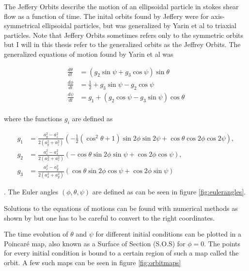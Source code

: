 The Jeffery Orbits describe the motion of an ellipsoidal particle in stokes shear flow as a function of time. The inital orbits found by Jeffery were for axis-symmetrical ellipsoidal particles, but was generalized by Yarin et al \cite{Yarin} to triaxial particles. Note that Jeffery Orbits sometimes refers only to the symmetric orbits but I will in this thesis refer to the generalized orbits as the Jeffrey Orbits. The generalized equations of motion found by Yarin et al was

\begin{subequations}\label{eq:jeffrey}
\begin{align}
\frac{d\theta}{dt} 	&= (g_2 \sin \psi + g_3 \cos \psi ) \sin \theta \\
\frac{d\phi}{dt} 	&= \tfrac{1}{2} + g_3\sin \psi - g_2 \cos \psi\\
\frac{d\psi}{dt}	&= g_1 + (g_2\cos \psi - g_3\sin \psi) \cos \theta \\
\end{align}
\end{subequations}

where the functions  $g_i$ are defined as

\begin{subequations}
\begin{align}
g_1 &= \frac{a_y^2 - a_z^2}{2(a_y^2 + a_z^2)} 
		\left(-\tfrac{1}{2}(\cos^2 \theta + 1 )\sin 2\phi \sin 2\psi + \cos\theta \cos 2\phi \cos 2\psi \right), \\
g_2 &= \frac{a_z^2 - a_x^2}{2(a_x^2 + a_z^2)}
		\left( -\cos\theta \sin 2\phi \sin\psi  +  \cos 2\phi \cos\psi \right), \\
g_3 &= \frac{a_x^2 - a_y^2}{2(a_x^2 + a_y^2)}
		\left( \cos\theta \sin 2\phi \cos\psi + \cos 2\phi \sin\psi \right)
\end{align}
\end{subequations}

. The Euler angles $(\phi, \theta, \psi)$ are defined as can be seen in figure \ref{fig:eulerangles}. 

Solutions to the equations of motions can be found with numerical methods as shown by \cite{Yarin} but one has to be careful to convert to the right coordinates. 

The time evolution of $\theta$ and $\psi$ for different initial conditions can be plotted in a Poincaré map, also known 
as a Surface of Section (S.O.S) \cite{poincare} for $\phi = 0$. The points for every initial condition is bound to a certain region of such a map called the orbit. A few such maps can be seen in figure \ref{fig:orbitmaps}


